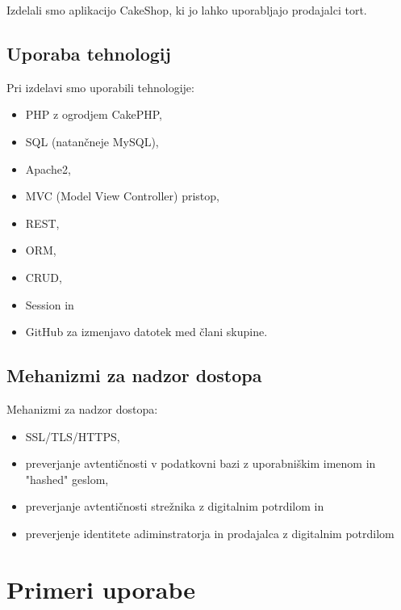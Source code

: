 \documentclass[a4paper,12pt]{report}
\begin{document}

Izdelali smo aplikacijo CakeShop, ki jo lahko uporabljajo prodajalci tort.

\section{Uporaba tehnologij}

Pri izdelavi smo uporabili tehnologije:

\begin{itemize}
  \item PHP z ogrodjem CakePHP,
  \item SQL (natančneje MySQL),
  \item Apache2,
  \item MVC (Model View Controller) pristop,
  \item REST,
  \item ORM,
  \item CRUD,
  \item Session in
  \item GitHub za izmenjavo datotek med člani skupine.
\end{itemize}

\section{Mehanizmi za nadzor dostopa}

Mehanizmi za nadzor dostopa:
\begin{itemize}
  \item SSL/TLS/HTTPS,
  \item preverjanje avtentičnosti v podatkovni bazi z uporabniškim imenom in "hashed" geslom,
  \item preverjanje avtentičnosti strežnika z digitalnim potrdilom in 
  \item preverjenje identitete adiminstratorja in prodajalca z digitalnim potrdilom
\end{itemize}


\chapter{Primeri uporabe}
\end{document}
